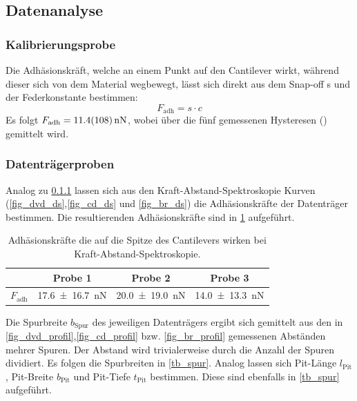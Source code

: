 \documentclass[
	a4paper,
	12pt,
	pagesize,
	ngerman
]{scrartcl}
\begin{document}
	\subsection{Datenanalyse}
	\subsubsection{Kalibrierungsprobe} \label{sss_kali}
	Die Adhäsionskräft, welche an einem Punkt auf den Cantilever wirkt, während dieser sich von dem Material wegbewegt, lässt sich direkt aus dem Snap-off s und der Federkonstante bestimmen:
	\begin{equation}
			\label{eq_adh}
			F_\text{adh} = s \cdot c
	\end{equation}
	Es folgt $F_\text{adh}=\SI{11.4+-10.8}{nN}$, wobei über die fünf gemessenen Hysteresen () gemittelt wird.

	\subsubsection{Datenträgerproben} %
	Analog zu \cref{sss_kali} lassen sich aus den Kraft-Abstand-Spektroskopie Kurven (\cref{fig_dvd_ds},\cref{fig_cd_ds} und \cref{fig_br_ds}) die Adhäsionskräfte der Datenträger bestimmen.
	Die resultierenden Adhäsionskräfte sind in \cref{tb_adh} aufgeführt.

\begin{table}[H]
		\centering
		\begin{tabular}{ c | c | c | c }
			 & Probe 1 & Probe 2 & Probe 3\\ \hline
			$F_\text{adh}$ & \SI{17.6+-16.7}{nN} & \SI{20.0+-19.0}{nN} &\SI{14.0+-13.3}{nN} \\
		\end{tabular}
		\caption{Adhäsionskräfte die auf die Spitze des Cantilevers wirken bei Kraft-Abstand-Spektroskopie.}
		\label{tb_adh}
\end{table}

	Die Spurbreite $b_\text{Spur}$ des jeweiligen Datenträgers ergibt sich gemittelt aus den in \cref{fig_dvd_profil},\cref{fig_cd_profil} bzw. \cref{fig_br_profil} gemessenen Abständen mehrer Spuren.
	Der Abstand wird trivialerweise durch die Anzahl der Spuren dividiert.
	Es folgen die Spurbreiten in \cref{tb_spur}.
	Analog lassen sich Pit-Länge $l_\text{Pit}$ , Pit-Breite $b_\text{Pit}$ und Pit-Tiefe $t_\text{Pit}$ bestimmen.
	Diese sind ebenfalls in \cref{tb_spur} aufgeführt.
\end{document}
